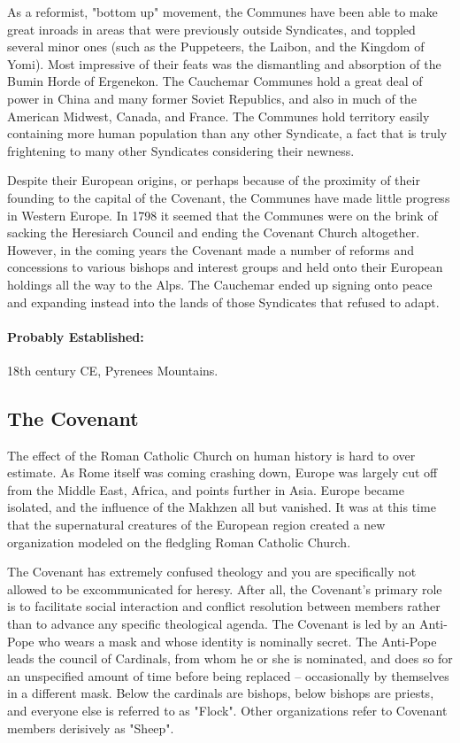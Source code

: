 As a reformist, "bottom up" movement, the Communes have been able to make great inroads in areas that were previously outside Syndicates, and toppled several minor ones (such as the Puppeteers, the Laibon, and the Kingdom of Yomi). Most impressive of their feats was the dismantling and absorption of the Bumin Horde of Ergenekon. The Cauchemar Communes hold a great deal of power in China and many former Soviet Republics, and also in much of the American Midwest, Canada, and France. The Communes hold territory easily containing more human population than any other Syndicate, a fact that is truly frightening to many other Syndicates considering their newness.

Despite their European origins, or perhaps because of the proximity of their founding to the capital of the Covenant, the Communes have made little progress in Western Europe. In 1798 it seemed that the Communes were on the brink of sacking the Heresiarch Council and ending the Covenant Church altogether. However, in the coming years the Covenant made a number of reforms and concessions to various bishops and interest groups and held onto their European holdings all the way to the Alps. The Cauchemar ended up signing onto peace and expanding instead into the lands of those Syndicates that refused to adapt.

\paragraph{Probably Established:} 18th century CE, Pyrenees Mountains.

\subsection{The Covenant} 

The effect of the Roman Catholic Church on human history is hard to over estimate. As Rome itself was coming crashing down, Europe was largely cut off from the Middle East, Africa, and points further in Asia. Europe became isolated, and the influence of the Makhzen all but vanished. It was at this time that the supernatural creatures of the European region created a new organization modeled on the fledgling Roman Catholic Church.

The Covenant has extremely confused theology and you are specifically not allowed to be excommunicated for heresy. After all, the Covenant's primary role is to facilitate social interaction and conflict resolution between members rather than to advance any specific theological agenda. The Covenant is led by an Anti-Pope who wears a mask and whose identity is nominally secret. The Anti-Pope leads the council of Cardinals, from whom he or she is nominated, and does so for an unspecified amount of time before being replaced -- occasionally by themselves in a different mask. Below the cardinals are bishops, below bishops are priests, and everyone else is referred to as "Flock". Other organizations refer to Covenant members derisively as "Sheep".

